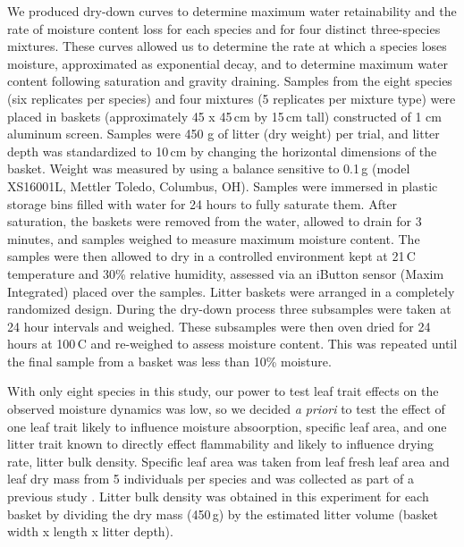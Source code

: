 \documentclass[fire,article,submit,moreauthors,pdftex]{Definitions/mdpi}
\begin{document}
We produced dry-down curves to determine maximum water retainability and the
rate of moisture content loss for each species and for four distinct
three-species mixtures. These curves allowed us to determine the rate at which
a species loses moisture, approximated as exponential decay, and to determine
maximum water content following saturation and gravity draining. Samples from
the eight species (six replicates per species) and four mixtures (5 replicates
per mixture type) were placed in baskets (approximately 45 x 45\,cm by 15\,cm
tall) constructed of 1 cm aluminum screen. Samples were 450 g of litter (dry
weight) per trial, and litter depth was standardized to 10\,cm by changing the
horizontal dimensions of the basket. Weight was measured by using a balance
sensitive to 0.1\,g (model XS16001L, Mettler Toledo, Columbus, OH). Samples were
immersed in plastic storage bins filled with water for 24 hours to fully
saturate them. After saturation, the baskets were removed from the water,
allowed to drain for 3 minutes, and samples weighed to measure maximum moisture
content. The samples were then allowed to dry in a controlled environment kept
at 21\,C temperature and 30\% relative humidity, assessed via an iButton sensor
(Maxim Integrated) placed over the samples. Litter baskets were arranged in a
completely randomized design. During the dry-down process three subsamples were
taken at 24 hour intervals and weighed. These subsamples were then oven dried
for 24 hours at 100\,C and re-weighed to assess moisture content. This was
repeated until the final sample from a basket was less than 10\% moisture.




With only eight species in this study, our power to test leaf trait effects on
the observed moisture dynamics was low, so we decided \emph{a priori} to test
the effect of one leaf trait likely to influence moisture absoorption, specific
leaf area, and one litter trait known to directly effect flammability and
likely to influence drying rate, litter bulk density. Specific leaf area was
taken from leaf fresh leaf area and leaf dry mass from 5 individuals per
species and was collected as part of a previous study
\cite{Magalhaes+Schwilk-2012}. Litter bulk density was obtained in this
experiment for each basket by dividing the dry mass (450\,g) by the estimated
litter volume (basket width x length x litter depth).
\end{document}
